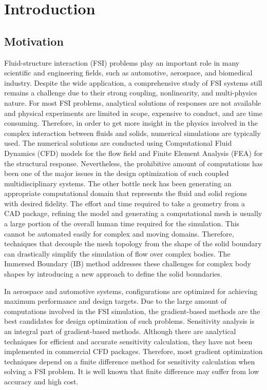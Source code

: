 \chapter{Introduction}\label{ch:introduction}
\section{Motivation}
Fluid-structure interaction (FSI) problems play an important role in many scientific and engineering fields, such as automotive, aerospace, and biomedical industry. Despite the wide application, a comprehensive study of FSI systems still remains a challenge due to their strong coupling, nonlinearity, and multi-physics nature. For most FSI problems, analytical solutions of responses are not available and physical experiments are limited in scope, expensive to conduct, and are time consuming. Therefore, in order to get more insight in the physics involved in the complex interaction between fluids and solids, numerical simulations are typically used. The numerical solutions are conducted using Computational Fluid Dynamics (CFD) models for the flow field and Finite Element Analysis (FEA) for the structural response. Nevertheless, the prohibitive amount of computations has been one of the major issues in the design optimization of such coupled multidisciplinary systems. The other bottle neck has been generating an appropriate computational domain that represents the fluid and solid regions with desired fidelity. The effort and time required to take a geometry from a CAD package, refining the model and generating a computational mesh is usually a large portion of the overall human time required for the simulation. This cannot be automated easily for complex and moving domains. Therefore, techniques that decouple the mesh topology from the shape of the solid boundary can drastically simplify the simulation of flow over complex bodies. The Immersed Boundary (IB) method addresses these challenges for complex body shapes by introducing a new approach to define the solid boundaries.

In aerospace and automotive systems, configurations are optimized for achieving maximum performance and design targets. Due to the large amount of computations involved in the FSI simulation, the gradient-based methods are the best candidates for design optimization of such problems. Sensitivity analysis is an integral part of gradient-based methods. Although there are analytical techniques for efficient and accurate sensitivity calculation, they have not been implemented in commercial CFD packages. Therefore, most gradient optimization techniques depend on a finite difference method for sensitivity calculation when solving a FSI problem. It is well known that finite difference may suffer from low accuracy and high cost.

